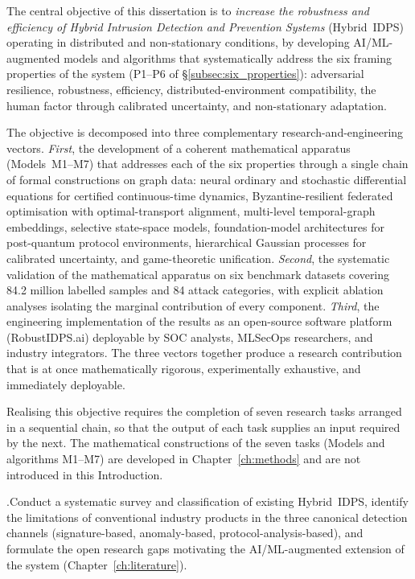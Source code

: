The central objective of this dissertation is to \emph{increase the
robustness and efficiency of Hybrid Intrusion Detection and Prevention
Systems} (Hybrid~IDPS) operating in distributed and non-stationary
conditions, by developing AI/ML-augmented models and algorithms that
systematically address the six framing properties of the system
(P1--P6 of \S\ref{subsec:six_properties}): adversarial resilience,
robustness, efficiency, distributed-environment compatibility, the
human factor through calibrated uncertainty, and non-stationary
adaptation.

The objective is decomposed into three complementary
research-and-engineering vectors. \emph{First}, the development of
a coherent mathematical apparatus (Models~M1--M7) that addresses
each of the six properties through a single chain of formal
constructions on graph data: neural ordinary and stochastic
differential equations for certified continuous-time dynamics,
Byzantine-resilient federated optimisation with optimal-transport
alignment, multi-level temporal-graph embeddings, selective
state-space models, foundation-model architectures for
post-quantum protocol environments, hierarchical Gaussian
processes for calibrated uncertainty, and game-theoretic
unification. \emph{Second}, the systematic validation of the
mathematical apparatus on six benchmark datasets covering 84.2
million labelled samples and 84 attack categories, with explicit
ablation analyses isolating the marginal contribution of every
component. \emph{Third}, the engineering implementation of the
results as an open-source software platform (RobustIDPS.ai)
deployable by SOC analysts, MLSecOps researchers, and industry
integrators. The three vectors together produce a research
contribution that is at once mathematically rigorous,
experimentally exhaustive, and immediately deployable.

Realising this objective requires the completion of seven research
tasks arranged in a sequential chain, so that the output of each
task supplies an input required by the next. The mathematical
constructions of the seven tasks (Models and algorithms M1--M7) are
developed in Chapter~\ref{ch:methods} and are not introduced in this
Introduction.

.\quad Conduct a systematic survey and classification of
existing Hybrid~IDPS, identify the limitations of conventional
industry products in the three canonical detection channels
(signature-based, anomaly-based, protocol-analysis-based), and
formulate the open research gaps motivating the AI/ML-augmented
extension of the system (Chapter~\ref{ch:literature}).

